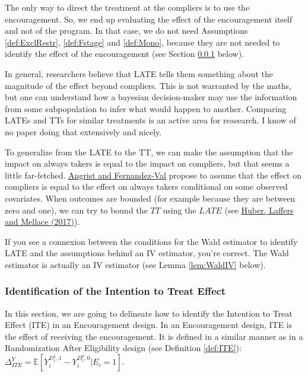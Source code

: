 \documentclass[]{book}
\newcommand{\esp}[1]{\mathbb{E}[ #1 ]}
\theoremstyle{definition}
\theoremstyle{definition}
\theoremstyle{definition}
\theoremstyle{remark}
\let\BeginKnitrBlock\begin \let\EndKnitrBlock\end
\begin{document}
The only way to direct the treatment at the compliers is to use the encouragement.
So, we end up evaluating the effect of the encouragement itself and not of the program.
In that case, we do not need Assumptions \ref{def:ExclRestr}, \ref{def:Fstage} and \ref{def:Mono}, because they are not needed to identify the effect of the encouragement (see Section \ref{ITEEncourag} below).

In general, researchers believe that LATE tells them something about the magnitude of the effect beyond compliers.
This is not warranted by the maths, but one can understand how a bayesian decision-maker may use the information from some subpopulation to infer what would happen to another.
Comparing LATEs and TTs for similar treatments is an active area for reasearch.
I know of no paper doing that extensively and nicely.

To generalize from the LATE to the TT, we can make the assumption that the impact on always takers is equal to the impact on compliers, but that seems a little far-fetched.
\href{https://www.nber.org/papers/w16566}{Angrist and Fernandez-Val} propose to assume that the effect on compliers is equal to the effect on always takers conditional on some observed covariates.
When outcomes are bounded (for example because they are between zero and one), we can try to bound the \(TT\) using the \(LATE\) (see \href{https://onlinelibrary.wiley.com/doi/abs/10.1002/jae.2473}{Huber, Laffers and Mellace (2017)}).

\BeginKnitrBlock{remark}
\iffalse{} {Remark. } \fi{}If you see a connexion between the conditions for the Wald estimator to identify LATE and the assumptions behind an IV estimator, you're correct.
The Wald estimator is actually an IV estimator (see Lemma \ref{lem:WaldIV} below).
\EndKnitrBlock{remark}

\hypertarget{ITEEncourag}{%
\subsubsection{Identification of the Intention to Treat Effect}\label{ITEEncourag}}

In this section, we are going to delineate how to identify the Intention to Treat Effect (ITE) in an Encouragement design.
In an Encouragement design, ITE is the effect of receiving the encouragement.
It is defined in a similar manner as in a Randomization After Eligibility design (see Definition \ref{def:ITE}): \(\Delta^Y_{ITE} = \esp{Y_i^{D_i^1,1}-Y_i^{D_i^0,0}|E_i=1}\).
\end{document}
